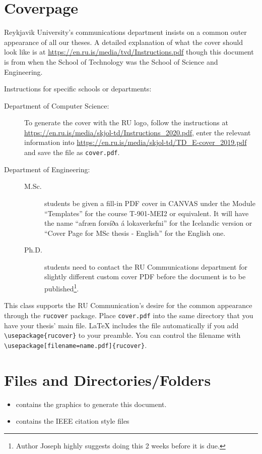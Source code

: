 \section{Coverpage}\label{sec:coverpage}

Reykjavik University's communications department insists on a common outer appearance of all our theses.
A detailed explanation of what the cover should look like is at \url{https://en.ru.is/media/tvd/Instructions.pdf} though this document is from when the School of Technology was the School of Science and Engineering.

Instructions for specific schools or departments:
\begin{description}
\item[Department of Computer Science:]  To generate the cover with the RU logo, follow the instructions at
  \url{https://en.ru.is/media/skjol-td/Instructions_2020.pdf}, enter the relevant information into \url{https://en.ru.is/media/skjol-td/TD_E-cover_2019.pdf} and save the file as \texttt{cover.pdf}.
\item[Department of Engineering:]
  \begin{description}
  \item[M.Sc.] students be given a fill-in PDF cover in CANVAS under the Module ``Templates'' for the course T-901-MEI2 or equivalent.  It will have the name ``afræn forsíða á lokaverkefni'' for the Icelandic version or ``Cover Page for MSc thesis - English'' for the English one.
  \item[Ph.D.] students need to contact the RU Communications department for slightly different custom cover PDF before the document is to be published\footnote{Author Joseph highly suggests doing this 2 weeks before it is due.}.
  \end{description}
\end{description}

This class supports the RU Communication's desire for the common appearance through the \texttt{rucover} package.
Place \texttt{cover.pdf} into the same directory that you have your thesis' main file.
\LaTeX{} includes the file automatically if you add \verb|\usepackage{rucover}| to your preamble.
You can control the filename with \verb|\usepackage[filename=name.pdf]{rucover}|.


\section{Files and Directories/Folders}
\begin{itemize}
\item {} contains the graphics to generate this document.
\item {} contains the IEEE citation style files
\end{itemize}

